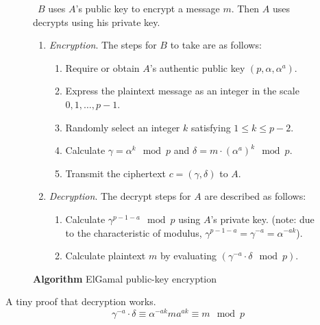 \documentclass[12pt,journal,compsoc]{IEEEtran}
\begin{document}
\begin{figure}[!h]
  \centering
  \begin{algorithmic}
    \ENSURE~$B$ uses $A$'s public key to encrypt a message $m$. Then
    $A$ uses decrypts using his private key.
    \begin{enumerate}
    \item \emph{Encryption}. The steps for $B$ to take are as follows:
      \begin{enumerate}
      \item Require or obtain $A$'s authentic public key
        $(p,\alpha,\alpha^{a})$. 
      \item Express the plaintext message as an integer in the scale
        ${0,1,\ldots,p-1}$. 
      \item Randomly select an integer $k$ satisfying $1\leq k\leq
        p-2$.
      \item Calculate $\gamma=\alpha^{k}\mod p$ and
        $\delta=m\cdot{(\alpha^{a})}^{k}\mod p$.
      \item Transmit the ciphertext $c=(\gamma,\delta)$ to $A$.
      \end{enumerate}
    \item \emph{Decryption}. The decrypt steps for $A$ are described
      as follows:
      \begin{enumerate}
      \item Calculate $\gamma^{p-1-a}\mod p$ using $A$'s private
        key. (note: due to the characteristic of modulus,
        $\gamma^{p-1-a}=\gamma^{-a}=\alpha^{-ak}$). 
      \item Calculate plaintext $m$ by evaluating
        $(\gamma^{-a}\cdot\delta\mod p)$.
      \end{enumerate}
    \end{enumerate}
  \end{algorithmic}
  \caption{\textbf{Algorithm} ElGamal public-key encryption}
  \label{fig:basic-elgamal-public-key-encry-algo}
\end{figure}
\par
A tiny proof that decryption works.
\begin{equation}
  \label{eq:basic-elgamal-encry-algo}
  \gamma^{-a}\cdot\delta\equiv\alpha^{-ak}ma^{ak}\equiv m\mod p
\end{equation}

\end{document}

